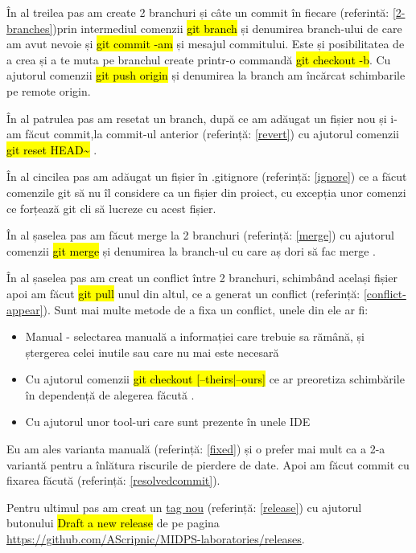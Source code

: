 În al treilea pas am create 2 branchuri și câte un commit în fiecare (referintă: \ref{2-branches})prin intermediul comenzii \hl{git branch} și denumirea branch-ului de care am avut nevoie și \hl{git commit -am} și mesajul commitului. Este și posibilitatea de a crea și a te muta pe branchul create printr-o commandă \hl{git checkout -b}. Cu ajutorul comenzii  \hl{git push origin} și denumirea la branch am încărcat schimbarile pe remote origin.

În al patrulea pas am resetat un branch, după ce am adăugat un fișier nou și i-am făcut commit,la commit-ul anterior (referință: \ref{revert}) cu ajutorul comenzii \hl{git reset HEAD\~} \cite{reset}.

În al cincilea pas am adăugat un fișier în .gitignore (referință: \ref{ignore}) ce a făcut comenzile git să nu îl considere ca un fișier din proiect, cu excepția unor comenzi ce forțează git cli să lucreze cu acest fișier.

În al șaselea pas am făcut merge la 2 branchuri (referință: \ref{merge}) cu ajutorul comenzii \hl{git merge} și denumirea la branch-ul cu care aș dori să fac merge \cite{merge}.

În al șaselea pas am creat un conflict între 2 branchuri, schimbând același fișier apoi am făcut \hl{git pull} unul din altul, ce a generat un conflict (referință: \ref{conflict-appear}). Sunt mai multe metode de a fixa un conflict, unele din ele ar fi:
\begin{itemize}
	\item Manual - selectarea manuală a informației care trebuie sa rămână, și ștergerea celei inutile sau care nu mai este necesară
	\item Cu ajutorul comenzii \hl{git checkout [--theirs|--ours]} ce ar preoretiza schimbările în dependență de alegerea făcută \cite{checkout-fix}. 
	\item Cu ajutorul unor tool-uri care sunt prezente în unele IDE
\end{itemize} 

Eu am ales varianta manuală (referință: \ref{fixed}) și o prefer mai mult ca a 2-a variantă pentru a înlătura riscurile de pierdere de date. Apoi am făcut commit cu fixarea făcută (referință: \ref{resolvedcommit}).

Pentru ultimul pas am creat un \href{https://github.com/AScripnic/MIDPS-laboratories/releases/tag/v0.0.1}{tag nou} (referință: \ref{release}) cu ajutorul butonului \hl{Draft a new release} de pe pagina \url{https://github.com/AScripnic/MIDPS-laboratories/releases}.


